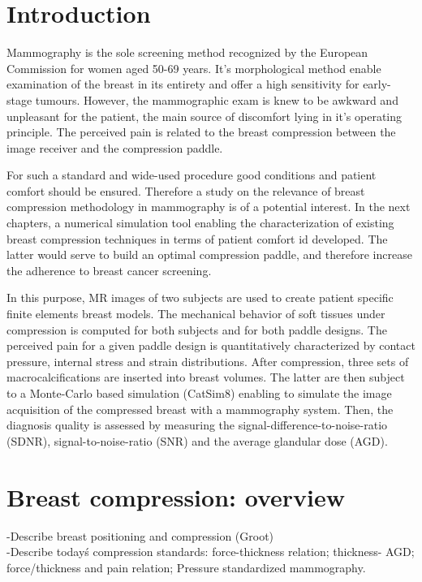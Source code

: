 
\section{Introduction }\label{compression:introduction}



Mammography is the sole screening method recognized by the European Commission for women aged 50-69 years. It's morphological method enable examination of the breast in its entirety and offer a high sensitivity for early-stage tumours. However, the mammographic exam is knew to be awkward and  unpleasant for the patient,  the main source of discomfort lying in it's operating principle. The perceived pain is related to the breast compression between the image receiver and the compression paddle.

For such a standard and wide-used procedure good conditions and patient comfort should be ensured. Therefore a study on the relevance of breast compression methodology in mammography is of a potential interest. In the next chapters, a numerical simulation tool enabling the characterization of existing breast compression techniques in terms of patient comfort id developed. 
 The latter would serve to build an optimal compression paddle, and therefore increase the adherence to breast cancer screening. 




In this purpose, MR images of two subjects are used to create patient specific finite elements breast models. The mechanical behavior of soft tissues under compression is computed for both subjects and for both paddle designs. The perceived pain for a given paddle design is quantitatively characterized by contact pressure, internal stress and strain distributions. After compression, three sets of macrocalcifications are inserted into breast volumes. The latter are then subject to a Monte-Carlo based simulation (CatSim8) enabling to simulate the image acquisition of the compressed breast with a mammography system. Then, the diagnosis quality is assessed by measuring the signal-difference-to-noise-ratio (SDNR), signal-to-noise-ratio (SNR) and the average glandular dose (AGD). 
\clearpage 
\section{Breast compression: overview }\label{section:compression:stateoftheart}

{\color{darkblue}
-Describe breast positioning and compression (Groot) \\
-Describe today\'s  compression standards: force-thickness relation; thickness- AGD; force/thickness and pain relation;  Pressure standardized mammography.}

